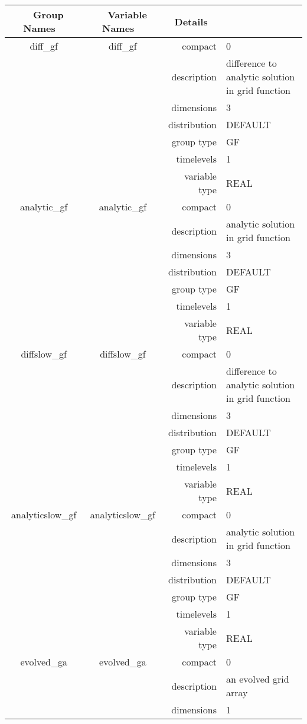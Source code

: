 \begin{tabular*}{150mm}{|c|c@{\extracolsep{\fill}}|rl|} \hline 
~ {\bf Group Names} ~ & ~ {\bf Variable Names} ~  &{\bf Details} ~ & ~ \\ 
\hline 
diff\_gf & diff\_gf & compact & 0 \\ 
 &  & description & difference to analytic solution in grid function \\ 
 &  & dimensions & 3 \\ 
 &  & distribution & DEFAULT \\ 
 &  & group type & GF \\ 
 &  & timelevels & 1 \\ 
 &  & variable type & REAL \\ 
\hline 
analytic\_gf & analytic\_gf & compact & 0 \\ 
 &  & description & analytic solution in grid function \\ 
 &  & dimensions & 3 \\ 
 &  & distribution & DEFAULT \\ 
 &  & group type & GF \\ 
 &  & timelevels & 1 \\ 
 &  & variable type & REAL \\ 
\hline 
diffslow\_gf & diffslow\_gf & compact & 0 \\ 
 &  & description & difference to analytic solution in grid function \\ 
 &  & dimensions & 3 \\ 
 &  & distribution & DEFAULT \\ 
 &  & group type & GF \\ 
 &  & timelevels & 1 \\ 
 &  & variable type & REAL \\ 
\hline 
analyticslow\_gf & analyticslow\_gf & compact & 0 \\ 
 &  & description & analytic solution in grid function \\ 
 &  & dimensions & 3 \\ 
 &  & distribution & DEFAULT \\ 
 &  & group type & GF \\ 
 &  & timelevels & 1 \\ 
 &  & variable type & REAL \\ 
\hline 
evolved\_ga & evolved\_ga & compact & 0 \\ 
 &  & description & an evolved grid array \\ 
 &  & dimensions & 1 \\ 

\end{tabular*}
